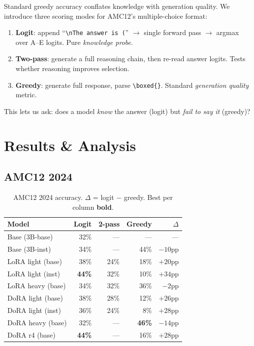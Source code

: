 \documentclass[11pt,twocolumn]{article}
\begin{document}
Standard greedy accuracy conflates knowledge with generation quality. We introduce three scoring modes for AMC12's multiple-choice format:
\begin{enumerate}[leftmargin=*, noitemsep, topsep=2pt]
  \item \textbf{Logit}: append ``\texttt{\textbackslash nThe answer is (}'' $\to$ single forward pass $\to$ argmax over A--E logits. Pure \emph{knowledge probe}.
  \item \textbf{Two-pass}: generate a full reasoning chain, then re-read answer logits. Tests whether reasoning improves selection.
  \item \textbf{Greedy}: generate full response, parse \texttt{\textbackslash boxed\{\}}. Standard \emph{generation quality} metric.
\end{enumerate}
This lets us ask: does a model \emph{know} the answer (logit) but \emph{fail to say it} (greedy)?

\section{Results \& Analysis}

\subsection{AMC12 2024}

\begin{table}[H]
\centering
\caption{AMC12 2024 accuracy. $\Delta$ = logit $-$ greedy. Best per column \textbf{bold}.}
\label{tab:amc2024}
\small
\setlength{\tabcolsep}{4pt}
\begin{tabular}{lrrrr}
\toprule
Model & Logit & 2-pass & Greedy & $\Delta$ \\
\midrule
Base (3B-base)     & 32\% & ---  & ---  & ---     \\
Base (3B-inst)     & 34\% & ---  & 44\% & $-10$pp \\
\midrule
LoRA light (base)  & 38\% & 24\% & 18\% & $+20$pp \\
LoRA light (inst)  & \textbf{44\%} & 32\% & 10\% & $+34$pp \\
LoRA heavy (base)  & 34\% & 32\% & 36\% & $-2$pp  \\
\midrule
DoRA light (base)  & 38\% & 28\% & 12\% & $+26$pp \\
DoRA light (inst)  & 36\% & 24\% & 8\%  & $+28$pp \\
DoRA heavy (base)  & 32\% & ---  & \textbf{46\%} & $-14$pp \\
DoRA r4 (base)     & \textbf{44\%} & --- & 16\% & $+28$pp \\
\bottomrule
\end{tabular}
\end{table}
\end{document}
